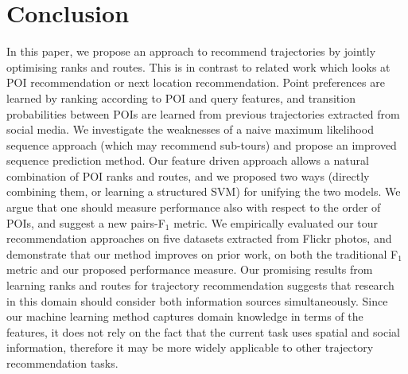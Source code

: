 \section{Conclusion}
\label{sec:conclusion}

In this paper, we propose an approach to recommend trajectories
by jointly optimising ranks and routes.
This is in contrast to related work which looks at
POI recommendation or next location recommendation.
Point preferences are learned by ranking according to POI and query features,
and transition probabilities between POIs are learned from previous trajectories extracted
from social media.
We investigate the weaknesses of a naive maximum likelihood sequence approach (which
may recommend sub-tours) and propose an improved sequence prediction method.
Our feature driven approach allows a natural combination of POI ranks and routes,
and we proposed two ways (directly combining them, or learning a structured SVM)
for unifying the two models.
We argue that one should measure performance also with respect to the order of POIs, and
suggest a new pairs-F$_1$ metric.
We empirically evaluated our tour recommendation approaches on five datasets extracted from
Flickr photos, and demonstrate that our method improves on prior work, on both the traditional
F$_1$ metric and our proposed performance measure.
Our promising results from learning ranks and routes for trajectory recommendation suggests
that research in this domain should consider both information sources simultaneously.
Since our machine learning method captures domain knowledge in terms of the features,
it does not rely on the fact that the current task uses spatial and social information,
therefore it may be more widely applicable to other trajectory recommendation tasks.
